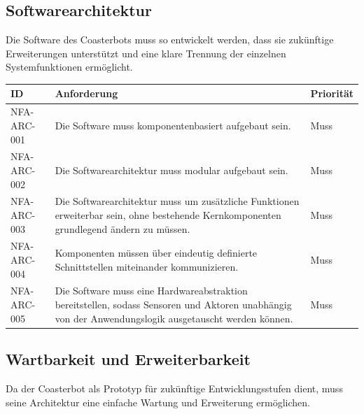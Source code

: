 \documentclass[
  a4paper,
  12pt,
  DIV=12,        %
  parskip=half,  %
  headings=small %
]{scrartcl}
\theoremstyle{definition}
\theoremstyle{definition}
\begin{document}
\subsection{Softwarearchitektur}\label{softwarearchitektur}

Die Software des Coasterbots muss so entwickelt werden, dass sie
zukünftige Erweiterungen unterstützt und eine klare Trennung der
einzelnen Systemfunktionen ermöglicht.

\begin{longtable}[]{@{}
  >{\raggedright\arraybackslash}p{}
  >{\raggedright\arraybackslash}p{}
  >{\raggedright\arraybackslash}p{}@{}}
\toprule\noalign{}
\begin{minipage}[b]{\linewidth}\raggedright
ID
\end{minipage} & \begin{minipage}[b]{\linewidth}\raggedright
Anforderung
\end{minipage} & \begin{minipage}[b]{\linewidth}\raggedright
Priorität
\end{minipage} \\
\midrule\noalign{}
\endhead
\bottomrule\noalign{}
\endlastfoot
NFA-ARC-001 & Die Software muss komponentenbasiert aufgebaut sein. &
Muss \\
NFA-ARC-002 & Die Softwarearchitektur muss modular aufgebaut sein. &
Muss \\
NFA-ARC-003 & Die Softwarearchitektur muss um zusätzliche Funktionen
erweiterbar sein, ohne bestehende Kernkomponenten grundlegend ändern zu
müssen. & Muss \\
NFA-ARC-004 & Komponenten müssen über eindeutig definierte
Schnittstellen miteinander kommunizieren. & Muss \\
NFA-ARC-005 & Die Software muss eine Hardwareabstraktion bereitstellen,
sodass Sensoren und Aktoren unabhängig von der Anwendungslogik
ausgetauscht werden können. & Muss \\
\end{longtable}

\subsection{Wartbarkeit und
Erweiterbarkeit}\label{wartbarkeit-und-erweiterbarkeit}

Da der Coasterbot als Prototyp für zukünftige Entwicklungsstufen dient,
muss seine Architektur eine einfache Wartung und Erweiterung
ermöglichen.
\end{document}
